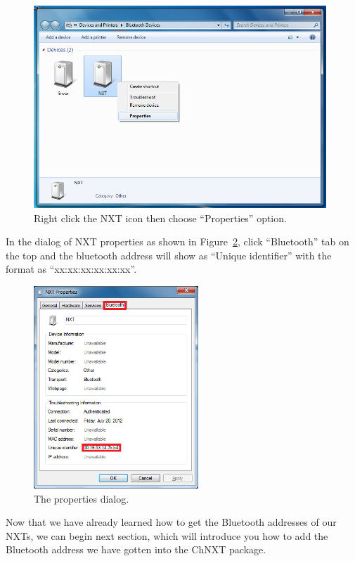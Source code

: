 \documentclass[11pt]{article}
\begin{document}
\begin{figure}[H]
  \begin{center}
    \includegraphics[height=3in]{figure/configuration/getBTaddress/btProperties.png}
    \caption{Right click the NXT icon then choose ``Properties'' option.\label{fig:bt_property}}
  \end{center}
\end{figure}
In the dialog of NXT properties as shown in Figure~\ref{fig:bt_property_dialog}, 
click ``Bluetooth'' tab on the top and the bluetooth address will show as ``Unique 
identifier'' with the format as ``xx:xx:xx:xx:xx:xx''.
\begin{figure}[H]
  \begin{center}
    \includegraphics[height=3in]{figure/configuration/getBTaddress/btPropertiesDlg.png}
    \caption{The properties dialog.\label{fig:bt_property_dialog}}
  \end{center}
\end{figure}
Now that we have already learned how to get the Bluetooth addresses of our NXTs, 
we can begin next section, which will introduce you how to add the Bluetooth 
address we have gotten into the ChNXT package.
\end{document}
